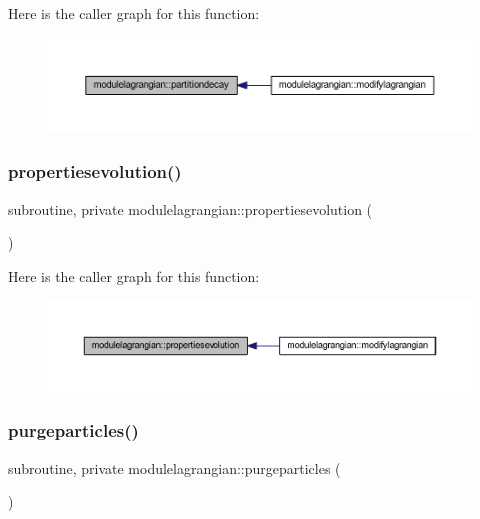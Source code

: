 Here is the caller graph for this function\+:\nopagebreak
\begin{figure}[H]
\begin{center}
\leavevmode
\includegraphics[width=350pt]{namespacemodulelagrangian_ad1541366b9db02d7a143f29f81d45a3d_icgraph}
\end{center}
\end{figure}
\mbox{\label{namespacemodulelagrangian_ad1d58143078dee3bc7c85e4ca9c03197}} 
\subsubsection{\texorpdfstring{propertiesevolution()}{propertiesevolution()}}
{\footnotesize\ttfamily subroutine, private modulelagrangian\+::propertiesevolution (\begin{DoxyParamCaption}{ }\end{DoxyParamCaption})\hspace{0.3cm}{\ttfamily [private]}}

Here is the caller graph for this function\+:\nopagebreak
\begin{figure}[H]
\begin{center}
\leavevmode
\includegraphics[width=350pt]{namespacemodulelagrangian_ad1d58143078dee3bc7c85e4ca9c03197_icgraph}
\end{center}
\end{figure}
\mbox{\label{namespacemodulelagrangian_a4ad3bdd3ff9c81a87e1b11eeea429acd}} 
\subsubsection{\texorpdfstring{purgeparticles()}{purgeparticles()}}
{\footnotesize\ttfamily subroutine, private modulelagrangian\+::purgeparticles (\begin{DoxyParamCaption}{ }\end{DoxyParamCaption})\hspace{0.3cm}{\ttfamily [private]}}

